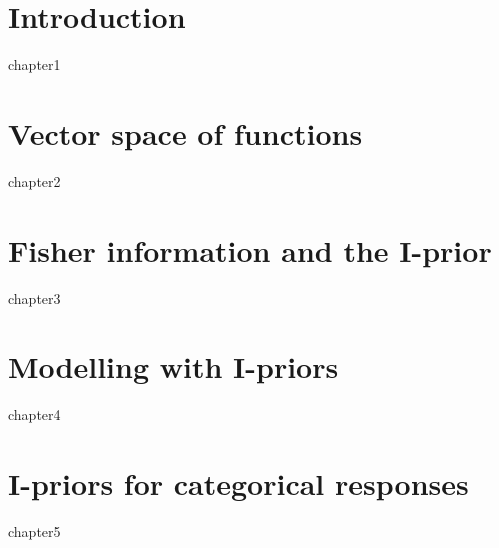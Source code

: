 \documentclass[a4paper,showframe,11pt]{report}
\begin{document}
\hTOCandLists
\clearpage


\chapter{Introduction} 
{chapter1}

\chapter{Vector space of functions}
{chapter2}

\chapter{Fisher information and the I-prior}
{chapter3}

\chapter{Modelling with I-priors}
{chapter4}

\chapter{I-priors for categorical responses}
{chapter5}

%
%

\hPrintBibliography
\end{document}
